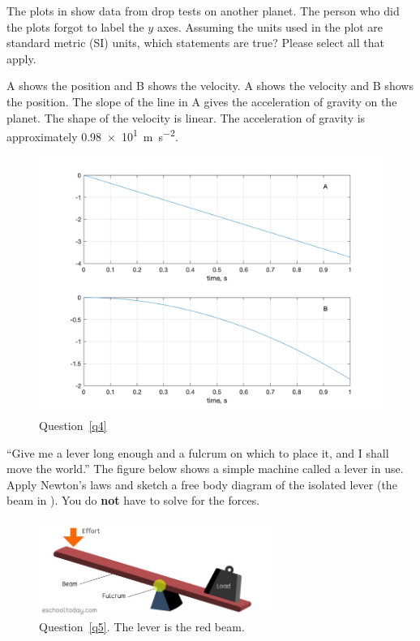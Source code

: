 \documentclass[exam,addpoints, noanswers]{exam}
\begin{document}
\begin{questions}
\clearpage
\question[5]\label{q4} The plots in  show data from drop tests on another planet. The person who did the plots forgot to label the $y$ axes. Assuming the units used in the plot are standard metric (SI) units, which statements are true? Please select all that apply. 
\begin{choices}
\choice A shows the position and B shows the velocity. 
\CorrectChoice A shows the velocity and B shows the position.
\CorrectChoice The slope of the line in A gives the acceleration of gravity on the planet. 
\CorrectChoice The shape of the velocity is linear. 
\choice The acceleration of gravity is approximately \SI{0.98e1}{\meter\per\second\squared}. 
\end{choices}
\setcounter{figure}{3}
\begin{figure}[h]
\begin{center}
\includegraphics[width=5in]{Q3Aq4.png}
\end{center}
\caption{Question~\ref{q4}}
\label{fig:q4}
\end{figure}


\clearpage
\question[5]\label{q5} ``Give me a lever long enough and a fulcrum on which to place it, and I shall move the world.''  The figure below shows a simple machine called a lever in use. Apply Newton's laws and sketch a free body diagram of the isolated lever (the beam in ). You do \textbf{not} have to solve for the forces. 
\begin{solution}[5in]
\end{solution}
\setcounter{figure}{4}
\begin{figure}[h]
\begin{center}
\includegraphics[width=3in]{parts-of-a-lever.jpg}
\end{center}
\caption{Question~\ref{q5}. The lever is the red beam. }
\label{fig:q5}
\end{figure}


\end{questions}
\end{document}

